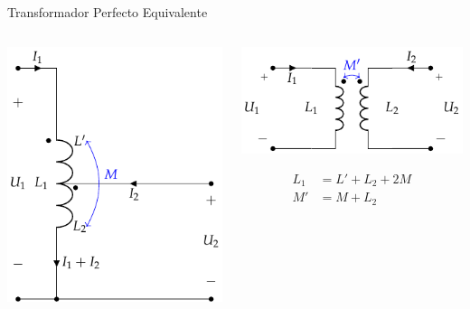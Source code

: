 \documentclass[aspectratio=169, usenames,svgnames,dvipsnames]{beamer}
\begin{document}
\begin{frame}[label={sec:orgc79246d}]{Transformador Perfecto Equivalente}
\begin{columns}
\begin{column}{0.5\columnwidth}
\begin{center}
\includegraphics[height=0.6\textheight]{../figs/AutotrafoPerfecto.pdf}
\end{center}
\end{column}
\begin{column}{0.5\columnwidth}
\begin{center}
\includegraphics[height=0.4\textheight]{../figs/AutoTrafo_TrafoPerfecto.pdf}
\end{center}

\begin{align*}
  L_1 &= L' + L_2 + 2M\\
  M' &= M + L_2
\end{align*}
\end{column}
\end{columns}
\end{frame}
\end{document}
